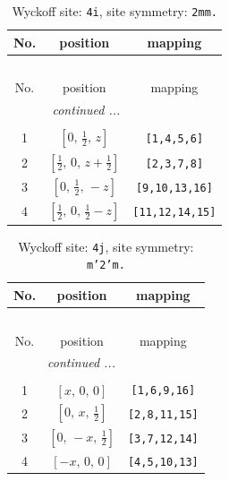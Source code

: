 \documentclass[fleqn,8pt]{jsarticle}
\begin{document}
\renewcommand{\arraystretch}{1.2}
\begin{longtable}{ccc}
\caption{Wyckoff site: {\tt 4i}, site symmetry: {\tt 2mm.}}
 \\
 \hline \hline
No. & position & mapping \\ \hline \endfirsthead

\multicolumn{2}{l}{\tablename\ \thetable{}} \\
 \hline \hline
No. & position & mapping \\ \hline \endhead

 \hline \hline
\multicolumn{2}{r}{\footnotesize\it continued ...} \\ \endfoot

 \hline \hline
\multicolumn{2}{r}{} \\ \endlastfoot

1 & $\left[ 0,\, \frac{1}{2},\, z \right]$ & {\tt [1,4,5,6]} \\ \hline
2 & $\left[ \frac{1}{2},\, 0,\, z + \frac{1}{2} \right]$ & {\tt [2,3,7,8]} \\ \hline
3 & $\left[ 0,\, \frac{1}{2},\, - z \right]$ & {\tt [9,10,13,16]} \\ \hline
4 & $\left[ \frac{1}{2},\, 0,\, \frac{1}{2} - z \right]$ & {\tt [11,12,14,15]} \\
\end{longtable}
\renewcommand{\arraystretch}{1.2}
\begin{longtable}{ccc}
\caption{Wyckoff site: {\tt 4j}, site symmetry: {\tt m'2'm.}}
 \\
 \hline \hline
No. & position & mapping \\ \hline \endfirsthead

\multicolumn{2}{l}{\tablename\ \thetable{}} \\
 \hline \hline
No. & position & mapping \\ \hline \endhead

 \hline \hline
\multicolumn{2}{r}{\footnotesize\it continued ...} \\ \endfoot

 \hline \hline
\multicolumn{2}{r}{} \\ \endlastfoot

1 & $\left[ x,\, 0,\, 0 \right]$ & {\tt [1,6,9,16]} \\ \hline
2 & $\left[ 0,\, x,\, \frac{1}{2} \right]$ & {\tt [2,8,11,15]} \\ \hline
3 & $\left[ 0,\, - x,\, \frac{1}{2} \right]$ & {\tt [3,7,12,14]} \\ \hline
4 & $\left[ - x,\, 0,\, 0 \right]$ & {\tt [4,5,10,13]} \\
\end{longtable}
\end{document}
